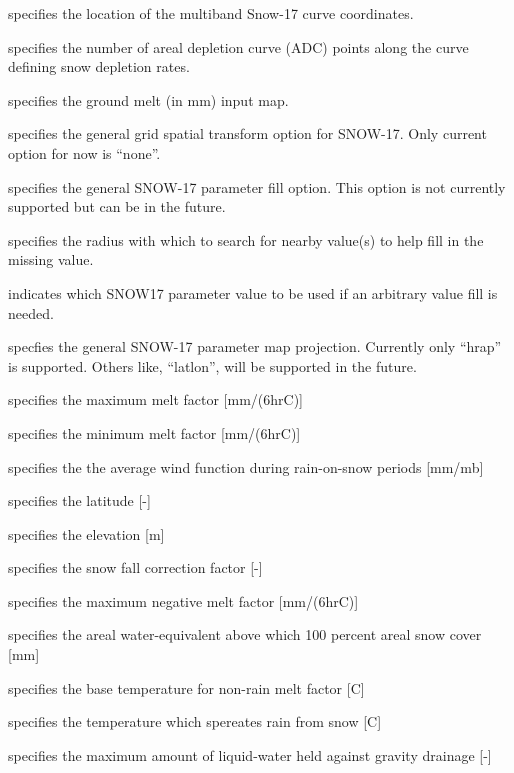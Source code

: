   specifies the location of the
 multiband Snow-17 curve coordinates.

  specifies the number
  of areal depletion curve (ADC) points along the curve defining snow depletion
  rates.

  specifies the ground melt (in mm) input map.

  specifies the general grid spatial
  transform option for SNOW-17.  Only current option for now is ``none''.

  specifies the general SNOW-17
 parameter fill option.  This option is not currently supported
 but can be in the future.

  specifies the radius with which
 to search for nearby value(s) to help fill in the missing value.

  indicates which  SNOW17 parameter
 value to be used if an arbitrary value fill is needed. 

  specfies the general SNOW-17 parameter
  map projection.  Currently only ``hrap'' is supported.  Others like, ``latlon'',
  will be supported in the future.

  specifies the
 maximum melt factor [mm/(6hrC)]

  specifies the
 minimum melt factor [mm/(6hrC)]

  specifies the
 the average wind function during rain-on-snow periods [mm/mb]

  specifies the
 latitude [-]

  specifies the
 elevation [m]

  specifies the
 snow fall correction factor [-]

  specifies the
 maximum negative melt factor [mm/(6hrC)]

  specifies the
 areal water-equivalent above which 100 percent areal snow cover  [mm]

  specifies the
 base temperature for non-rain melt factor [C]

  specifies the
 temperature which spereates rain from snow  [C]

  specifies the
 maximum amount of liquid-water held against gravity drainage  [-]

